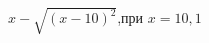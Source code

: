 \begin{ex}[type=calculate_expression]
	\begin{condition}
		\( x-\sqrt{(x-10)^2} \),\quad при \( x=10,1 \)
	\end{condition}
\end{ex}